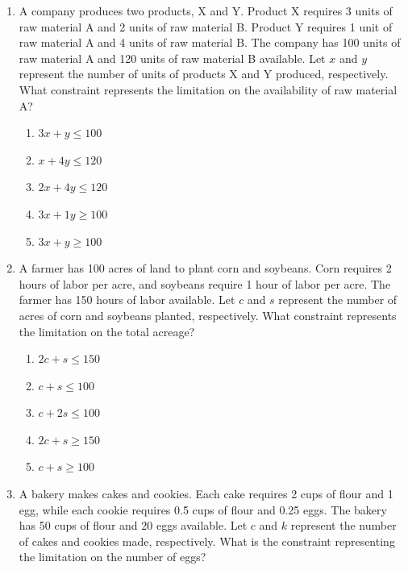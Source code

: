 \documentclass{article}%
\begin{document}
\begin{enumerate}
\begin{enumerate}
\item Maximize $Z = 10x_A + 15x_B$ subject to $2x_A + x_B \le 100$, $x_A + 3x_B \le 150$, $x_A, x_B \le 0$%
\item Maximize $Z = 10x_A + 15x_B$ subject to $2x_A + x_B = 100$, $x_A + 3x_B = 150$, $x_A, x_B \ge 0$%
\item Minimize $Z = 10x_A + 15x_B$ subject to $2x_A + x_B \le 100$, $x_A + 3x_B \le 150$, $x_A, x_B \ge 0$%
\end{enumerate}%
\vspace{1em}%
\item A company produces two products, X and Y. Product X requires 3 units of raw material A and 2 units of raw material B. Product Y requires 1 unit of raw material A and 4 units of raw material B. The company has 100 units of raw material A and 120 units of raw material B available.  Let $x$ and $y$ represent the number of units of products X and Y produced, respectively. What constraint represents the limitation on the availability of raw material A?%
\begin{enumerate}%
\item $3x + y \le 100$%
\item $x + 4y \le 120$%
\item $2x + 4y \le 120$%
\item $3x + 1y \ge 100$%
\item $3x + y \ge 100$%
\end{enumerate}%
\vspace{1em}%
\item A farmer has 100 acres of land to plant corn and soybeans.  Corn requires 2 hours of labor per acre, and soybeans require 1 hour of labor per acre. The farmer has 150 hours of labor available.  Let $c$ and $s$ represent the number of acres of corn and soybeans planted, respectively. What constraint represents the limitation on the total acreage?%
\begin{enumerate}%
\item $2c + s \le 150$%
\item $c + s \le 100$%
\item $c + 2s \le 100$%
\item $2c + s \ge 150$%
\item $c + s \ge 100$%
\end{enumerate}%
\vspace{1em}%
\item A bakery makes cakes and cookies. Each cake requires 2 cups of flour and 1 egg, while each cookie requires 0.5 cups of flour and 0.25 eggs. The bakery has 50 cups of flour and 20 eggs available. Let $c$ and $k$ represent the number of cakes and cookies made, respectively.  What is the constraint representing the limitation on the number of eggs?%

\end{enumerate}
\end{document}
